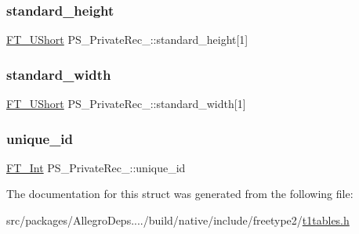 \subsubsection{\texorpdfstring{standard\+\_\+height}{standard\_height}}
{\footnotesize\ttfamily \hyperlink{fttypes_8h_a937f6c17cf5ffd09086d8610c37b9f58}{F\+T\+\_\+\+U\+Short} P\+S\+\_\+\+Private\+Rec\+\_\+\+::standard\+\_\+height\mbox{[}1\mbox{]}}

\mbox{\label{struct_p_s___private_rec___a1c8ae2204e63c22b7702446720ed50a3}} 
\subsubsection{\texorpdfstring{standard\+\_\+width}{standard\_width}}
{\footnotesize\ttfamily \hyperlink{fttypes_8h_a937f6c17cf5ffd09086d8610c37b9f58}{F\+T\+\_\+\+U\+Short} P\+S\+\_\+\+Private\+Rec\+\_\+\+::standard\+\_\+width\mbox{[}1\mbox{]}}

\mbox{\label{struct_p_s___private_rec___ae862c1db170cfee85aa3242be9fa5d57}} 
\subsubsection{\texorpdfstring{unique\+\_\+id}{unique\_id}}
{\footnotesize\ttfamily \hyperlink{fttypes_8h_af90e5fb0d07e21be9fe6faa33f02484c}{F\+T\+\_\+\+Int} P\+S\+\_\+\+Private\+Rec\+\_\+\+::unique\+\_\+id}



The documentation for this struct was generated from the following file\+:\begin{DoxyCompactItemize}
\item 
src/packages/\+Allegro\+Deps..../build/native/include/freetype2/\hyperlink{t1tables_8h}{t1tables.\+h}\end{DoxyCompactItemize}

